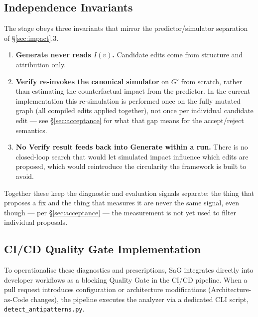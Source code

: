 \documentclass[review]{elsarticle}
\begin{document}
\subsection{Independence Invariants}
\label{sec:invariants}

The stage obeys three invariants that mirror the predictor/simulator separation of
\S\ref{sec:impact}.3.

\begin{enumerate}
\item \textbf{Generate never reads $I(v)$.} Candidate edits come from structure and attribution
  only.
\item \textbf{Verify re-invokes the canonical simulator} on $G'$ from scratch, rather than
  estimating the counterfactual impact from the predictor. In the current implementation this
  re-simulation is performed once on the fully mutated graph (all compiled edits applied together),
  not once per individual candidate edit --- see \S\ref{sec:acceptance} for what that gap means for
  the accept/reject semantics.
\item \textbf{No Verify result feeds back into Generate within a run.} There is no closed-loop
  search that would let simulated impact influence which edits are proposed, which would
  reintroduce the circularity the framework is built to avoid.
\end{enumerate}

Together these keep the diagnostic and evaluation signals separate: the thing that proposes a fix
and the thing that measures it are never the same signal, even though --- per \S\ref{sec:acceptance}
--- the measurement is not yet used to filter individual proposals.

\subsection{CI/CD Quality Gate Implementation}
\label{sec:gate}

To operationalise these diagnostics and prescriptions, SaG integrates directly into developer
workflows as a blocking Quality Gate in the CI/CD pipeline. When a pull request introduces
configuration or architecture modifications (Architecture-as-Code changes), the pipeline executes
the analyzer via a dedicated CLI script, \texttt{detect\_antipatterns.py}.
\end{document}
